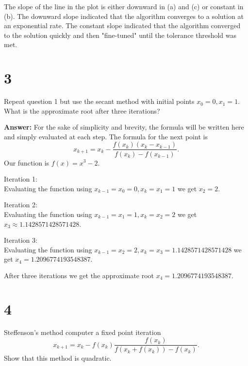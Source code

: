 \documentclass{article}
\begin{document}
The slope of the line in the plot is either downward in (a) and (c)
or constant in (b). The downward slope indicated that the algorithm
converges to a solution at an exponential rate. The constant slope
indicated that the algorithm converged to the solution quickly and then
"fine-tuned" until the tolerance threshold was met.

\section*{3}
Repeat question 1 but use the secant method with initial points
$x_0 = 0, x_1 = 1$. What is the approximate root after three iterations?

\textbf{Answer:}
For the sake of simplicity and brevity, the formula will be written here and
simply evaluated at each step. The formula for the next point is
\[x_{k+1} = x_k - \frac{f(x_k)(x_k - x_{k-1})}{f(x_k)-f(x_{k - 1})}.\]
Our function is $f(x) = x^3 - 2$.

Iteration 1:\\
Evaluating the function using $x_{k-1} = x_0 = 0, x_k = x_1 = 1$ we get
$x_2 = 2$.

Iteration 2:\\
Evaluating the function using $x_{k-1} = x_1 = 1, x_k = x_2 = 2 $ we get
$x_3 \approx 1.1428571428571428$.

Iteration 3:\\
Evaluating the function using $x_{k-1} = x_2 = 2, x_k = x_3 = 1.1428571428571428$
we get $x_4 = 1.2096774193548387$.

After three iterations we get the approximate root $x_4 = 1.2096774193548387$.

\section*{4}
Steffenson's method computer a fixed point iteration
\[x_{k+1} = x_k - f(x_k)\frac{f(x_k)}{f(x_k + f(x_k))-f(x_k)}.\]
Show that this method is quadratic.
\end{document}
